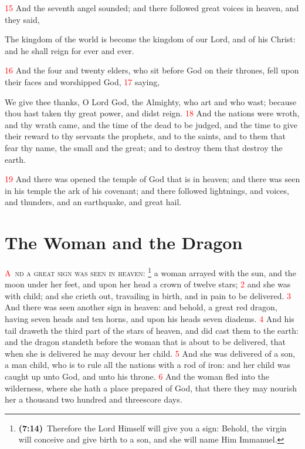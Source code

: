 \documentclass[12pt,twoside]{memoir}
\newcommand{\cbibleref}[3]{\textbf{\ibibleverse[textit]{#1}(#2)}\ {#3}}
\newcommand{\cbiblefoot}[3]{\footnote{\cbibleref{#1}{#2}{#3}}}
\newcommand{\vnum}[1]{\textcolor{red}{\normalsize{#1}}}
\begin{document}
\vnum{15} And the seventh angel sounded; and there followed great voices in heaven, and they said,

The kingdom of the world is become the kingdom of our Lord, and of his Christ: and he shall reign for ever and ever.

\vnum{16} And the four and twenty elders, who sit before God on their thrones, fell upon their faces and worshipped God, 
\vnum{17} saying,

We give thee thanks, O Lord God, the Almighty, who art and who wast; because thou hast taken thy great power, and didst reign. 
\vnum{18} And the nations were wroth, and thy wrath came, and the time of the dead to be judged, and the time to give their reward to thy servants the prophets, and to the saints, and to them that fear thy name, the small and the great; and to destroy them that destroy the earth.

\vnum{19} And there was opened the temple of God that is in heaven; and there was seen in his temple the ark of his covenant; and there followed lightnings, and voices, and thunders, and an earthquake, and great hail.



\chapter{The Woman and the Dragon}
\lettrine[lines=3,slope=0.5em]{\textcolor{red}{A}}{\ nd a great sign was seen in heaven}:%
	\cbiblefoot{Isaiah}{7:14}{Therefore the Lord Himself will give you a sign: Behold, the virgin will conceive and give birth to a son, and she will name Him Immanuel.}%
 a woman arrayed with the sun, and the moon under her feet, and upon her head a crown of twelve stars; 
\vnum{2} and she was with child; and she crieth out, travailing in birth, and in pain to be delivered. 
\vnum{3} And there was seen another sign in heaven: and behold, a great red dragon, having seven heads and ten horns, and upon his heads seven diadems. 
\vnum{4} And his tail draweth the third part of the stars of heaven, and did cast them to the earth: and the dragon standeth before the woman that is about to be delivered, that when she is delivered he may devour her child. 
\vnum{5} And she was delivered of a son, a man child, who is to rule all the nations with a rod of iron: and her child was caught up unto God, and unto his throne. 
\vnum{6} And the woman fled into the wilderness, where she hath a place prepared of God, that there they may nourish her a thousand two hundred and threescore days.
\end{document}
